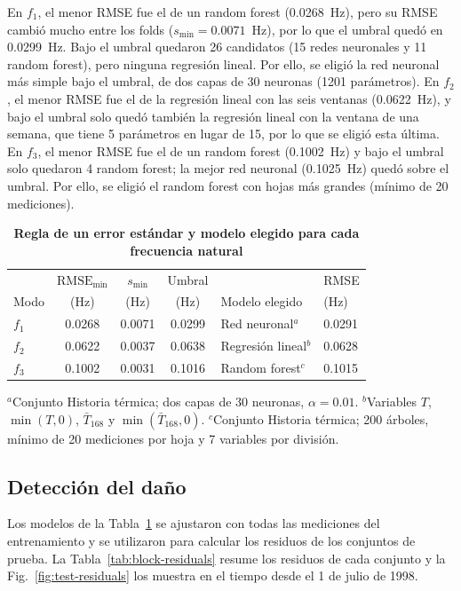 \documentclass[9pt,twocolumn,twoside]{opticajnl}
\begin{document}
En $f_1$, el menor RMSE fue el de un random forest (0.0268~Hz), pero su RMSE cambió mucho entre los folds ($s_{\min} = 0.0071$~Hz), por lo que el umbral quedó en 0.0299~Hz. Bajo el umbral quedaron 26 candidatos (15 redes neuronales y 11 random forest), pero ninguna regresión lineal. Por ello, se eligió la red neuronal más simple bajo el umbral, de dos capas de 30 neuronas (1201 parámetros). En $f_2$, el menor RMSE fue el de la regresión lineal con las seis ventanas (0.0622~Hz), y bajo el umbral solo quedó también la regresión lineal con la ventana de una semana, que tiene 5 parámetros en lugar de 15, por lo que se eligió esta última. En $f_3$, el menor RMSE fue el de un random forest (0.1002~Hz) y bajo el umbral solo quedaron 4 random forest; la mejor red neuronal (0.1025~Hz) quedó sobre el umbral. Por ello, se eligió el random forest con hojas más grandes (mínimo de 20 mediciones).

\begin{table}[!htb]
\centering
\caption{\bf Regla de un error estándar y modelo elegido para cada frecuencia natural}
\small
\setlength{\tabcolsep}{3pt}
\begin{tabular}{lcccll}
\hline
 & $\text{RMSE}_{\min}$ & $s_{\min}$ & Umbral & & RMSE \\
Modo & (Hz) & (Hz) & (Hz) & Modelo elegido & (Hz) \\
\hline
$f_1$ & 0.0268 & 0.0071 & 0.0299 & Red neuronal$^\textit{a}$ & 0.0291 \\
$f_2$ & 0.0622 & 0.0037 & 0.0638 & Regresión lineal$^\textit{b}$ & 0.0628 \\
$f_3$ & 0.1002 & 0.0031 & 0.1016 & Random forest$^\textit{c}$ & 0.1015 \\
\hline
\end{tabular}
  \label{tab:chosen-models}

\smallskip
\footnotesize
$^\textit{a}$Conjunto Historia térmica; dos capas de 30 neuronas, $\alpha = 0.01$. $^\textit{b}$Variables $T$, $\min(T,0)$, $\bar{T}_{168}$ y $\min(\bar{T}_{168},0)$. $^\textit{c}$Conjunto Historia térmica; 200 árboles, mínimo de 20 mediciones por hoja y 7 variables por división.
\end{table}

\subsection{Detección del daño}
\label{sec:results-detection}

Los modelos de la Tabla~\ref{tab:chosen-models} se ajustaron con todas las mediciones del entrenamiento y se utilizaron para calcular los residuos de los conjuntos de prueba. La Tabla~\ref{tab:block-residuals} resume los residuos de cada conjunto y la Fig.~\ref{fig:test-residuals} los muestra en el tiempo desde el 1 de julio de 1998.
\end{document}
